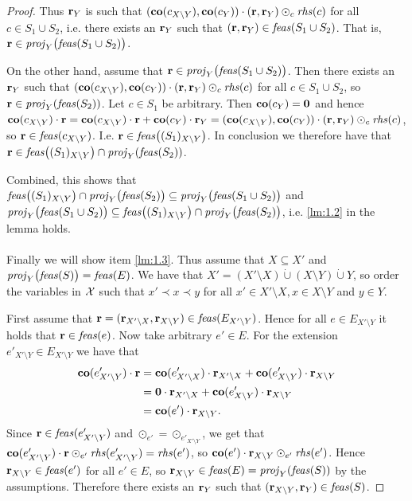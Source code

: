 \begin{proof}
Thus $\mathbf{r}_Y$ is such that $(\mathbf{co}(c_{X\setminus Y}),\mathbf{co}(c_Y))\cdot(\mathbf{r},\mathbf{r}_Y)\odot_{c}\mathit{rhs}(c)$ for all $c\in S_1\cup S_2$, i.e. there exists an $\mathbf{r}_Y$ such that $(\mathbf{r},\mathbf{r}_Y)\in \mathit{feas}(S_1\cup S_2)$. That is, $\mathbf{r}\in \mathit{proj}_Y\big(\mathit{feas}(S_1\cup S_2)\big)$.

On the other hand, assume that $\mathbf{r}\in\mathit{proj}_Y\big(\mathit{feas}(S_1\cup S_2)\big)$. Then there exists an $\mathbf{r}_Y$ such that $(\mathbf{co}(c_{X\setminus Y}),\mathbf{co}(c_Y))\cdot(\mathbf{r},\mathbf{r}_Y)\odot_{c}\mathit{rhs}(c)$ for all $c\in S_1\cup S_2$, so $\mathbf{r}\in\mathit{proj}_Y(\mathit{feas}(S_2))$. Let $c\in S_1$ be arbitrary. Then $\mathbf{co}(c_Y)=\mathbf{0}$ and hence $\mathbf{co}(c_{X\setminus Y})\cdot\mathbf{r} = \mathbf{co}(c_{X\setminus Y})\cdot\mathbf{r}+\mathbf{co}(c_Y)\cdot\mathbf{r}_Y =
(\mathbf{co}(c_{X\setminus Y}),\mathbf{co}(c_Y))\cdot(\mathbf{r},\mathbf{r}_Y) \odot_c\mathit{rhs}(c)$, so $\mathbf{r}\in \mathit{feas}(c_{X\setminus Y})$. I.e. $\mathbf{r}\in \mathit{feas}\big((S_1)_{X\setminus Y}\big)$. 
In conclusion we therefore have that $\mathbf{r}\in \mathit{feas}\big((S_1)_{X\setminus Y}\big)\cap  \mathit{proj}_Y(\mathit{feas}(S_2))$.

Combined, this shows that $\mathit{feas}\big((S_1)_{X\setminus Y}\big)\cap \mathit{proj}_Y\big(\mathit{feas}(S_2)\big)\subseteq \mathit{proj}_Y\big(\mathit{feas}(S_1\cup S_2)\big)$ and $\mathit{proj}_Y\big(\mathit{feas}(S_1\cup S_2)\big)\subseteq \mathit{feas}\big((S_1)_{X\setminus Y}\big)\cap \mathit{proj}_Y\big(\mathit{feas}(S_2)\big)$, i.e. \ref{lm:1.2} in the lemma holds.
\\\\
%
Finally we will show item \ref{lm:1.3}. Thus assume that $X\subseteq X'$ and $\mathit{proj}_Y\big(\mathit{feas}(S)\big)=\mathit{feas}(E)$.
We have that $X' = (X'\setminus X)\dot\cup(X\setminus Y)\dot\cup Y$, so order the variables in $\mathcal{X}$ such that $x'\prec x\prec y$ for all $x'\in X'\setminus X, x\in X\setminus Y$ and $y\in Y$.

First assume that $\mathbf{r} = (\mathbf{r}_{X'\setminus X}, \mathbf{r}_{X\setminus Y}) \in \mathit{feas}(E_{X'\setminus Y})$. 
Hence for all $e\in E_{X'\setminus Y}$ it holds that $\mathbf{r}\in\mathit{feas}(e)$.
Now take arbitrary $e'\in E$. For the extension $e'_{X'\setminus Y}\in E_{X'\setminus Y}$ we have that
\begin{align*}
\mathbf{co}(e'_{X'\setminus Y})\cdot \mathbf{r} 
&= \mathbf{co}(e'_{X'\setminus X})\cdot \mathbf{r}_{X'\setminus X} + \mathbf{co}(e'_{X\setminus Y})\cdot \mathbf{r}_{X\setminus Y}\\
&= \mathbf{0}\cdot \mathbf{r}_{X'\setminus X} + \mathbf{co}(e'_{X\setminus Y})\cdot \mathbf{r}_{X\setminus Y}\\
&=\mathbf{co}(e')\cdot\mathbf{r}_{X\setminus Y}.
\end{align*}
Since $\mathbf{r}\in\mathit{feas}(e'_{X'\setminus Y})$ and $\odot_{e'} =\odot_{e'_{X'\setminus Y}}$, we get that $\mathbf{co}(e'_{X'\setminus Y})\cdot \mathbf{r} \odot_{e'} \mathit{rhs}(e'_{X'\setminus Y}) = \mathit{rhs}(e')$, so $\mathbf{co}(e')\cdot\mathbf{r}_{X\setminus Y}\odot_{e'}\mathit{rhs}(e')$. 
Hence $\mathbf{r}_{X\setminus Y}\in \mathit{feas}(e')$ for all $e'\in E$, so $\mathbf{r}_{X\setminus Y}\in \mathit{feas}(E) = \mathit{proj}_Y(\mathit{feas}(S))$ by the assumptions.
Therefore there exists an $\mathbf{r}_Y$ such that $(\mathbf{r}_{X\setminus Y},\mathbf{r}_Y)\in \mathit{feas}(S)$.


\end{proof}
